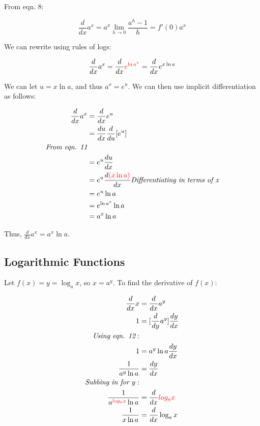 \documentclass[12pt]{article}
\begin{document}
From eqn. 8:

$$\frac{d}{dx}a^x = a^x \lim_{h\to 0} \frac{a^h-1}{h} = f'(0) a^x$$

We can rewrite using rules of logs:

$$\frac{d}{dx}a^x = \frac{d}{dx}\textcolor{red}{ e^{\ln a^x} } = \frac{d}{dx} e^{x\ln a}$$

We can let $u = x \ln a$, and thus $a^x = e^u$. We can then use implicit differentiation as follows:

\begin{equation}
    \begin{split}
        \frac{d}{dx} a^x &= \frac{d}{dx} e^u\\
        &=\frac{du}{dx} \frac{d}{du} [e^u]\\
        \textit{From eqn. 11}\\
        &=e^u \frac{du}{dx}\\
        &= e^u \frac{d \textcolor{red}{(x \ln a)}}{dx}
        \textit{Differentiating in terms of x}\\
        &= e^u \ln a\\
        &= e^{\ln a^x} \ln a\\
        &= a^x \ln a\\
    \end{split}
\end{equation}

Thus, $\frac{d}{dx} a^x = a^x \ln a$.

\subsection{Logarithmic Functions}

Let $f(x) = y = \log_a{x}$, so $x = a^y$. To find the derivative of $f(x)$:

\begin{equation}
    \begin{split}
        \frac{d}{dx} x &= \frac{d}{dx} a^y\\
        1 &= [\frac{d}{dy} a^y] \frac{dy}{dx}\\
        \textit{Using eqn. 12}:\\
        1 &= a^y \ln a \frac{dy}{dx}\\
        \frac{1}{a^y \ln a} &= \frac{dy}{dx}\\
        \textit{Subbing in for $y$}:\\
        \frac{1}{a^{\textcolor{red}{log_a{x}}} \ln a} &= \frac{d}{dx} \textcolor{red}{log_a{x}}\\
        \frac{1}{x \ln a} &= \frac{d}{dx} \log_a{x}
    \end{split}
\end{equation}
\end{document}
